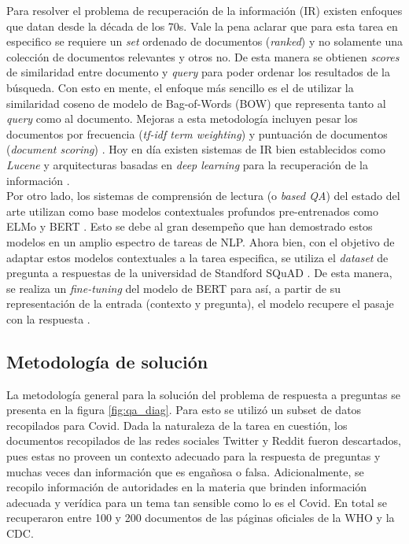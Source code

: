 Para resolver el problema de recuperación de la información (IR) existen enfoques que datan desde la década de los 70s. Vale la pena aclarar que para esta tarea en especifico se requiere un \textit{set} ordenado de documentos (\textit{ranked}) y no solamente una colección de documentos relevantes y otros no. De esta manera se obtienen \textit{scores} de similaridad entre documento y \textit{query} para poder ordenar los resultados de la búsqueda. Con esto en mente, el enfoque más sencillo es el de utilizar la similaridad coseno de modelo de Bag-of-Words (BOW) que representa tanto al \textit{query} como al documento. Mejoras a esta metodología incluyen pesar los documentos por frecuencia (\textit{tf-idf term weighting}) y puntuación de documentos (\textit{document scoring}) \cite{}. Hoy en día existen sistemas de IR bien establecidos como \textit{Lucene} \cite{lucene} y arquitecturas basadas en \textit{deep learning} para la recuperación de la información \cite{DL_IR}. \\

Por otro lado, los sistemas de comprensión de lectura (o \textit{based QA}) del estado del arte utilizan como base modelos contextuales profundos pre-entrenados como ELMo y BERT \cite{BertQA}. Esto se debe al gran desempeño que han demostrado estos modelos en un amplio espectro de tareas de NLP. Ahora bien, con el objetivo de adaptar estos modelos contextuales a la tarea especifica, se utiliza el \textit{dataset} de pregunta a respuestas de la universidad de Standford SQuAD \cite{squad}. De esta manera, se realiza un \textit{fine-tuning} del modelo de BERT para así, a partir de su representación de la entrada (contexto y pregunta), el modelo recupere el pasaje con la respuesta \cite{BERT_on_SQUAD}.

\subsection{Metodología de solución}

La metodología general para la solución del problema de respuesta a preguntas se presenta en la figura \ref{fig:qa_diag}. Para esto se utilizó un subset de datos recopilados para Covid. Dada la naturaleza de la tarea en cuestión, los documentos recopilados de las redes sociales Twitter y Reddit fueron descartados, pues estas no proveen un contexto adecuado para la respuesta de preguntas y muchas veces dan información que es engañosa o falsa. Adicionalmente, se recopilo información de autoridades en la materia que brinden información adecuada y verídica para un tema tan sensible como lo es el Covid. En total se recuperaron entre 100 y 200 documentos de las páginas oficiales de la WHO y la CDC. \\


